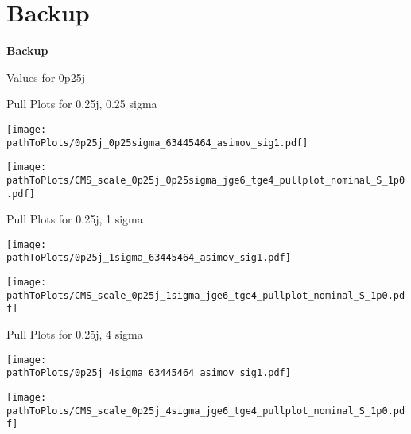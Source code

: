 \section*{Backup}
\begin{frame}
	\begin{center}
		\textbf{\Huge Backup}
	\end{center}
\end{frame}

\begin{frame}{Values for 0p25j}

\end{frame}


\begin{frame}{Pull Plots for 0.25j, 0.25 sigma}
\begin{minipage}{0.48\textwidth}
\centering
\texttt{[image: \\pathToPlots/0p25j\_0p25sigma\_63445464\_asimov\_sig1.pdf]}
\end{minipage}
\hfill
\begin{minipage}{0.48\textwidth}
\texttt{[image: \\pathToPlots/CMS\_scale\_0p25j\_0p25sigma\_jge6\_tge4\_pullplot\_nominal\_S\_1p0.pdf]}
\end{minipage}
\end{frame}

\begin{frame}{Pull Plots for 0.25j, 1 sigma}
\begin{minipage}{0.48\textwidth}
\centering
\texttt{[image: \\pathToPlots/0p25j\_1sigma\_63445464\_asimov\_sig1.pdf]}
\end{minipage}
\hfill
\begin{minipage}{0.48\textwidth}
\texttt{[image: \\pathToPlots/CMS\_scale\_0p25j\_1sigma\_jge6\_tge4\_pullplot\_nominal\_S\_1p0.pdf]}
\end{minipage}
\end{frame}

\begin{frame}{Pull Plots for 0.25j, 4 sigma}
\begin{minipage}{0.48\textwidth}
\centering
\texttt{[image: \\pathToPlots/0p25j\_4sigma\_63445464\_asimov\_sig1.pdf]}
\end{minipage}
\hfill
\begin{minipage}{0.48\textwidth}
\texttt{[image: \\pathToPlots/CMS\_scale\_0p25j\_4sigma\_jge6\_tge4\_pullplot\_nominal\_S\_1p0.pdf]}
\end{minipage}
\end{frame}


